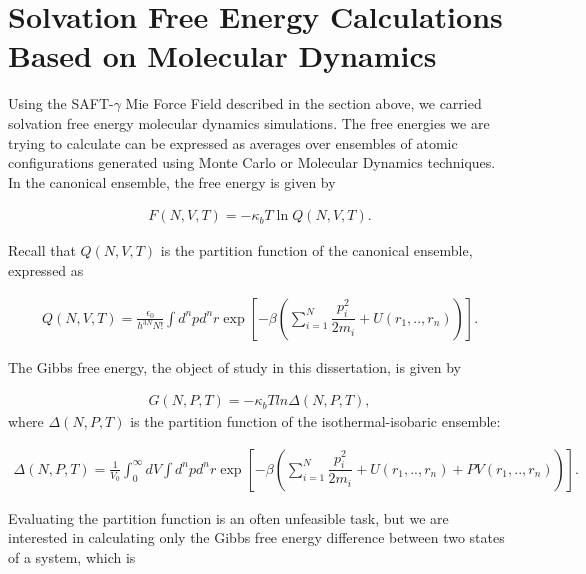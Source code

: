 \section{Solvation Free Energy Calculations Based on Molecular Dynamics}

Using the SAFT-$\gamma$ Mie Force Field described in the section above, we carried solvation free energy molecular dynamics simulations. The free energies we are trying to calculate can be expressed as averages over ensembles of atomic configurations generated using Monte Carlo or Molecular Dynamics techniques. In the canonical ensemble, the free energy is given by  

\begin{equation}
\label{eq:fcano}
\begin{aligned}
F(N,V,T) = -\kappa_{b}T \ln Q(N,V,T).
\end{aligned}
\end{equation}

Recall that $Q(N,V,T)$ is the partition function of the canonical ensemble, expressed as

\begin{equation}
\label{eq:partican}
\begin{aligned}
Q(N,V,T) =\frac{\epsilon_{0}}{h^{3N}N!} \int d^{n}p d^{n}r \exp \left[ -\beta \left( \sum_{i=1}^{N}\dfrac{p_{i}^{2}}{2m_{i}} + U(r_{1},..,r_{n}) \right)
\right] .
\end{aligned}
\end{equation}

The Gibbs free energy, the object of study in this dissertation, is given by

\begin{equation}
\begin{aligned}
G(N,P,T) = -\kappa_{b}T ln \Delta (N,P,T),
\end{aligned}
\end{equation}
where $\Delta (N,P,T)$ is the partition function of the isothermal-isobaric ensemble:

\begin{equation}
\begin{aligned}
\Delta (N,P,T) = \frac{1}{V_{0}} \int_{0}^{\infty} dV \int d^{n}p d^{n}r \exp \left[ -\beta \left( \sum_{i=1}^{N}\dfrac{p_{i}^{2}}{2m_{i}} + U(r_{1},..,r_{n}) + PV(r_{1},..,r_{n}) \right) \right].
\end{aligned}
\end{equation}

Evaluating the partition function is an often unfeasible task, but we are interested in calculating only the Gibbs free energy difference between two states of a system, which is  

